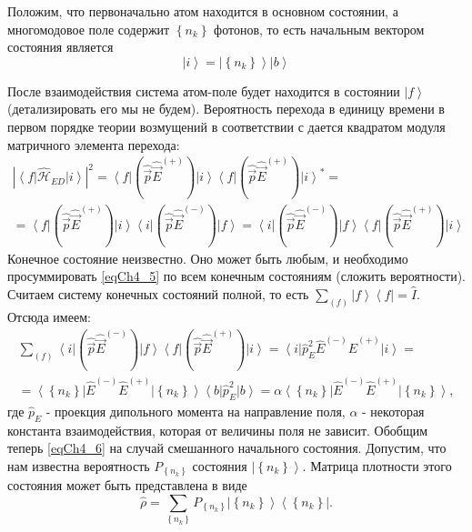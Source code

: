 Положим, что первоначально атом находится в основном состоянии, а
многомодовое поле содержит $\left\{n_k\right\}$ фотонов, то есть начальным
вектором состояния является 
\begin{equation}
\left|i\right> = \left|\left\{n_k\right\}\right> \left|b\right>
\label{eqCh4_4}
\end{equation}

После взаимодействия система атом-поле будет находится в состоянии
$\left|f\right>$ (детализировать его мы не будем). Вероятность
перехода в единицу времени в первом порядке теории возмущений в
соответствии с 
дается квадратом модуля матричного элемента перехода: 
\begin{eqnarray}
\left|\left<f\right|\hat{\mathcal{H}}_{ED}\left|i\right>\right|^2 =
\left<f\right|\left(\hat{\vec{p}}\hat{\vec{E}}^{(+)}\right)\left|i\right>
\left<f\right|\left(\hat{\vec{p}}\hat{\vec{E}}^{(+)}\right)\left|i\right>^{*}
= 
\nonumber \\
=
\left<f\right|\left(\hat{\vec{p}}\hat{\vec{E}}^{(+)}\right)\left|i\right>
\left<i\right|\left(\hat{\vec{p}}\hat{\vec{E}}^{(-)}\right)\left|f\right>
=
\left<i\right|\left(\hat{\vec{p}}\hat{\vec{E}}^{(-)}\right)\left|f\right>
\left<f\right|\left(\hat{\vec{p}}\hat{\vec{E}}^{(+)}\right)\left|i\right>
\label{eqCh4_5}
\end{eqnarray}
Конечное состояние неизвестно. Оно может быть любым, и необходимо
просуммировать \eqref{eqCh4_5} по всем конечным состояниям (сложить
вероятности). Считаем систему конечных состояний полной, то есть  
$\sum_{(f)} \left|f\right>\left<f\right| = \hat{I}$.
Отсюда имеем: 
\begin{eqnarray}
\sum_{(f)}
\left<i\right|\left(\hat{\vec{p}}\hat{\vec{E}}^{(-)}\right)\left|f\right>
\left<f\right|\left(\hat{\vec{p}}\hat{\vec{E}}^{(+)}\right)\left|i\right>
= 
\left<i\right|\hat{p}_E^2\hat{E}^{(-)}\hat{E}^{(+)}\left|i\right> = 
\nonumber \\
=
\left<\left\{n_k\right\}\right|\hat{E}^{(-)}\hat{E}^{(+)}\left|\left\{n_k\right\}\right>\left<b\right|\hat{p}_E^2\left|b\right>
= 
\alpha \left<\left\{n_k\right\}\right|\hat{E}^{(-)}\hat{E}^{(+)}\left|\left\{n_k\right\}\right>,
\label{eqCh4_6}
\end{eqnarray}
где $\hat{p}_E$ -  проекция дипольного момента на направление поля,
$\alpha$ - некоторая константа взаимодействия, которая от величины
поля не зависит. Обобщим теперь \eqref{eqCh4_6} на случай смешанного
начального состояния. Допустим, что нам известна вероятность
$P_{\left\{n_k\right\}}$ состояния  $\left|\left\{n_k\right\}\right>$.
Матрица плотности 
этого состояния может быть представлена в виде 
\begin{equation}
\hat{\rho} = \sum_{\left\{n_k\right\}}P_{\left\{n_k\right\}}
\left|\left\{n_k\right\}\right>\left<\left\{n_k\right\}\right|.
\label{eqCh4_7}
\end{equation}

